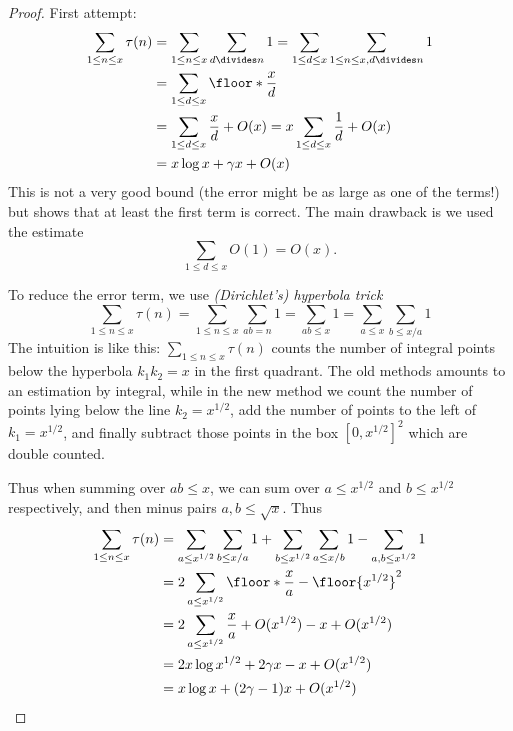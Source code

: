 \documentclass[a4paper]{article}
\begin{document}
\begin{proof}
  First attempt:
  \begin{align*}
    \sum_{1 \leq n \leq x} \tau(n)
    &= \sum_{1 \leq n \leq x} \sum_{d \divides n} 1
    = \sum_{1 \leq d \leq x} \sum_{1 \leq n \leq x, d \divides n} 1 \\
    &= \sum_{1 \leq d \leq x} \floor*{\frac{x}{d}} \\
    &= \sum_{1 \leq d \leq x} \frac{x}{d} + O(x)
    = x \sum_{1 \leq d \leq x} \frac{1}{d} + O(x) \\
    &= x\log x + \gamma x + O(x)
  \end{align*}
  This is not a very good bound (the error might be as large as one of the terms!) but shows that at least the first term is correct. The main drawback is we used the estimate
  \[
    \sum_{1 \leq d \leq x} O(1) = O(x).
  \]

  To reduce the error term, we use \emph{(Dirichlet's) hyperbola trick}
  \[
    \sum_{1 \leq n \leq x} \tau(n)
    = \sum_{1 \leq n \leq x} \sum_{ab = n} 1
    = \sum_{ab \leq x} 1
    = \sum_{a \leq x} \sum_{b \leq x/a} 1
  \]
  The intuition is like this: \(\sum_{1 \leq n \leq x} \tau(n)\) counts the number of integral points below the hyperbola \(k_1k_2 = x\) in the first quadrant. The old methods amounts to an estimation by integral, while in the new method we count the number of points lying below the line \(k_2 = x^{1/2}\), add the number of points to the left of \(k_1 = x^{1/2}\), and finally subtract those points in the box \([0, x^{1/2}]^2\) which are double counted.

  Thus when summing over \(ab \leq x\), we can sum over \(a \leq x^{1/2}\) and \(b \leq x^{1/2}\) respectively, and then minus pairs \(a, b \leq \sqrt x\). Thus
  \begin{align*}
    \sum_{1 \leq n \leq x} \tau(n)
    &= \sum_{a \leq x^{1/2}} \sum_{b \leq x/a} 1 + \sum_{b \leq x^{1/2}} \sum_{a \leq x/b} 1 - \sum_{a, b \leq x^{1/2}} 1 \\
    &= 2 \sum_{a \leq x^{1/2}} \floor*{\frac{x}{a}} - \floor{x^{1/2}}^2 \\
    &= 2 \sum_{a \leq x^{1/2}} \frac{x}{a} + O(x^{1/2}) - x + O(x^{1/2}) \\
    &= 2x\log x^{1/2} + 2 \gamma x - x + O(x^{1/2}) \\
    &= x \log x + (2\gamma - 1) x + O(x^{1/2})
  \end{align*}
\end{proof}
\end{document}
